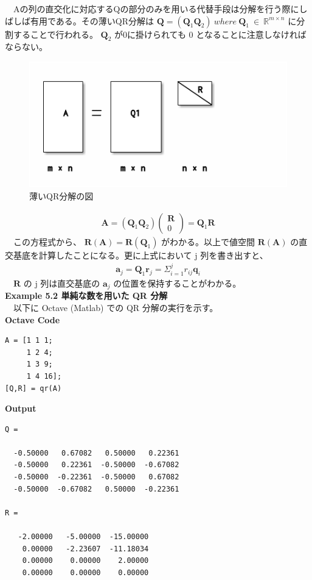 \documentclass[a4paper,10pt]{jarticle}
\begin{document}
　Aの列の直交化に対応するQの部分のみを用いる代替手段は分解を行う際にしばしば有用である。その薄いQR分解は \(\bm{Q} = (\bm{Q}_1\bm{Q}_2)\ where\ \bm{Q}_1\ \in\ \mathbb{R}^{m\times n}\) に分割することで行われる。 \(\bm{Q}_2\) が0に掛けられても 0 となることに注意しなければならない。\\

\begin{figure}[htbp]
\centering
\includegraphics[width=.9\linewidth]{../chapter5/figure5-2.png}
\caption{薄いQR分解の図}
\end{figure}

\begin{align*}
\bm{A} = (\bm{Q}_1\bm{Q}_2)\begin{pmatrix}\bm{R}\\0\end{pmatrix}=\bm{Q}_1\bm{R}
\end{align*}
　この方程式から、 \(\bm{R}(\bm{A})=\bm{R}(\bm{Q}_1)\) がわかる。以上で値空間 \(\bm{R(A)}\) の直交基底を計算したことになる。更に上式において j 列を書き出すと、\\
\begin{align*}
\bm{a}_j = \bm{Q}_1\bm{r}_j = \Sigma^j_{i = 1}r_{ij}\bm{q}_i
\end{align*}
　\(\bm{R}\) の j 列は直交基底の \(\bm{a}_j\) の位置を保持することがわかる。\\

\textbf{Example 5.2 単純な数を用いた QR 分解}\\

　以下に Octave (Matlab) での QR 分解の実行を示す。\\
\textbf{Octave Code}\\
\begin{verbatim}
A = [1 1 1;
     1 2 4; 
     1 3 9;
     1 4 16];
[Q,R] = qr(A)
\end{verbatim}
\textbf{Output}\\
\begin{verbatim}
Q =

  -0.50000   0.67082   0.50000   0.22361
  -0.50000   0.22361  -0.50000  -0.67082
  -0.50000  -0.22361  -0.50000   0.67082
  -0.50000  -0.67082   0.50000  -0.22361

R =

   -2.00000   -5.00000  -15.00000
    0.00000   -2.23607  -11.18034
    0.00000    0.00000    2.00000
    0.00000    0.00000    0.00000

\end{verbatim}
\end{document}
